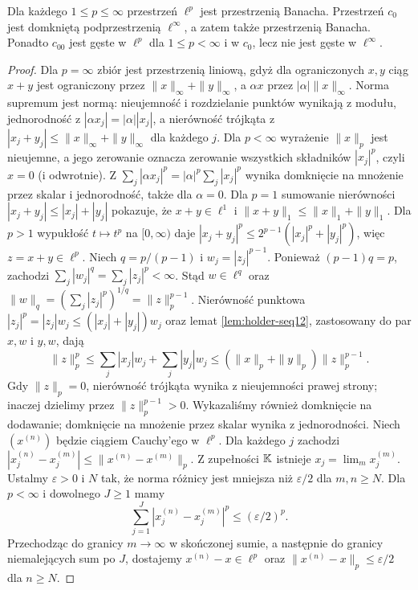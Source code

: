 \begin{twierdzenie}
\label{thm:seq-banach12}
Dla każdego $1\le p\le\infty$ przestrzeń $\ell^p$ jest przestrzenią Banacha.
Przestrzeń $c_0$ jest domkniętą podprzestrzenią $\ell^\infty$,
a zatem także przestrzenią Banacha. Ponadto $c_{00}$ jest gęste
w $\ell^p$ dla $1\le p<\infty$ i w $c_0$, lecz nie jest gęste
w $\ell^\infty$.
\end{twierdzenie}
\begin{proof}
Dla $p=\infty$ zbiór jest przestrzenią liniową, gdyż
dla ograniczonych $x,y$ ciąg $x+y$ jest ograniczony przez
$\|x\|_\infty+\|y\|_\infty$, a $\alpha x$ przez
$|\alpha|\|x\|_\infty$. Norma supremum jest normą: nieujemność i
rozdzielanie punktów wynikają z modułu, jednorodność z
$|\alpha x_j|=|\alpha||x_j|$, a nierówność trójkąta z
$|x_j+y_j|\le\|x\|_\infty+\|y\|_\infty$ dla każdego $j$.
Dla $p<\infty$ wyrażenie $\|x\|_p$ jest nieujemne,
a jego zerowanie oznacza zerowanie wszystkich składników
$|x_j|^p$, czyli $x=0$ (i odwrotnie).
Z $\sum_j|\alpha x_j|^p=|\alpha|^p\sum_j|x_j|^p$
wynika domknięcie na mnożenie przez skalar i jednorodność,
także dla $\alpha=0$. Dla $p=1$ sumowanie nierówności $|x_j+y_j|\le|x_j|+|y_j|$
pokazuje, że $x+y\in\ell^1$ i $\|x+y\|_1\le\|x\|_1+\|y\|_1$.
Dla $p>1$ wypukłość $t\mapsto t^p$ na $[0,\infty)$ daje
$|x_j+y_j|^p\le2^{p-1}(|x_j|^p+|y_j|^p)$, więc $z=x+y\in\ell^p$.
Niech $q=p/(p-1)$ i $w_j=|z_j|^{p-1}$.
Ponieważ $(p-1)q=p$, zachodzi
$\sum_j |w_j|^q=\sum_j|z_j|^p<\infty$.
Stąd $w\in\ell^q$ oraz
$\|w\|_q=(\sum_j|z_j|^p)^{1/q}=\|z\|_p^{p-1}$.
Nierówność punktowa
$|z_j|^p=|z_j|w_j\le (|x_j|+|y_j|)w_j$
oraz lemat \ref{lem:holder-seq12}, zastosowany do par
$x,w$ i $y,w$, dają
\[
 \|z\|_p^p\le\sum_j|x_j|w_j+\sum_j|y_j|w_j
 \le(\|x\|_p+\|y\|_p)\|z\|_p^{p-1}.
\]
Gdy $\|z\|_p=0$, nierówność trójkąta wynika z nieujemności
prawej strony; inaczej dzielimy przez $\|z\|_p^{p-1}>0$.
Wykazaliśmy również domknięcie na dodawanie; domknięcie na
mnożenie przez skalar wynika z jednorodności.
Niech $(x^{(n)})$ będzie ciągiem Cauchy'ego w $\ell^p$.
Dla każdego $j$ zachodzi
$|x_j^{(n)}-x_j^{(m)}|\le\|x^{(n)}-x^{(m)}\|_p$.
Z zupełności $\mathbb K$ istnieje $x_j=\lim_m x_j^{(m)}$.
Ustalmy $\varepsilon>0$ i $N$ tak, że norma różnicy jest
mniejsza niż $\varepsilon/2$ dla $m,n\ge N$.
Dla $p<\infty$ i dowolnego $J\ge1$ mamy
\[
 \sum_{j=1}^J|x_j^{(n)}-x_j^{(m)}|^p\le(\varepsilon/2)^p.
\]
Przechodząc do granicy $m\to\infty$ w skończonej sumie,
a następnie do granicy niemalejących sum po $J$, dostajemy
$x^{(n)}-x\in\ell^p$ oraz
$\|x^{(n)}-x\|_p\le\varepsilon/2$ dla $n\ge N$.

\end{proof}
